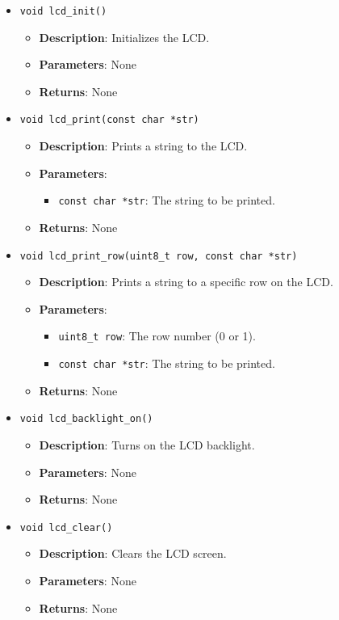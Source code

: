 \documentclass{article}
\begin{document}
\begin{itemize}
   \item \texttt{void lcd\_init()}
   \begin{itemize}
      \item \textbf{Description}: Initializes the LCD.
      \item \textbf{Parameters}: None
      \item \textbf{Returns}: None
   \end{itemize}

   \item \texttt{void lcd\_print(const char *str)}
   \begin{itemize}
      \item \textbf{Description}: Prints a string to the LCD.
      \item \textbf{Parameters}:
      \begin{itemize}
         \item \texttt{const char *str}: The string to be printed.
      \end{itemize}
      \item \textbf{Returns}: None
   \end{itemize}

   \item \texttt{void lcd\_print\_row(uint8\_t row, const char *str)}
   \begin{itemize}
      \item \textbf{Description}: Prints a string to a specific row on the LCD.
      \item \textbf{Parameters}:
      \begin{itemize}
         \item \texttt{uint8\_t row}: The row number (0 or 1).
         \item \texttt{const char *str}: The string to be printed.
      \end{itemize}
      \item \textbf{Returns}: None
   \end{itemize}

   \item \texttt{void lcd\_backlight\_on()}
   \begin{itemize}
      \item \textbf{Description}: Turns on the LCD backlight.
      \item \textbf{Parameters}: None
      \item \textbf{Returns}: None
   \end{itemize}

   \item \texttt{void lcd\_clear()}
   \begin{itemize}
      \item \textbf{Description}: Clears the LCD screen.
      \item \textbf{Parameters}: None
      \item \textbf{Returns}: None
   \end{itemize}


\end{itemize}
\end{document}
